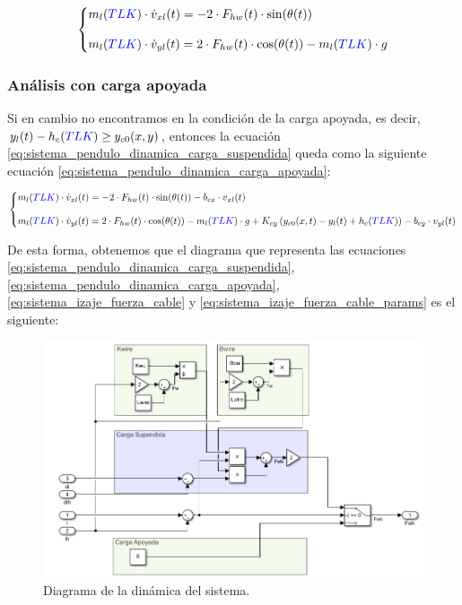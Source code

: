 \documentclass[11pt]{article}
\begin{document}
\begin{equation}
	\label{eq:sistema_pendulo_dinamica_carga_suspendida}
	\left\{
		\begin{matrix*}[l]
		m_{l}({\color{blue}TLK})\cdot \dot{v}_{xl}(t)= -2 \cdot F_{hw}(t)\cdot \sin(\theta(t))
		\\
		\\ 
		m_{l}({\color{blue}TLK})\cdot \dot{v}_{yl}(t)=2 \cdot F_{hw}(t)\cdot \cos(\theta(t))-m_{l}({\color{blue}TLK})\cdot g
		\end{matrix*}
	\right.
\end{equation}

\subsubsection{Análisis con carga apoyada}

Si en cambio no encontramos en la condición de la carga apoyada, es decir, $y_{l}(t)-h_{c}({\color{blue}TLK})\geq y_{c0}(x,y)$, entonces la ecuación \ref{eq:sistema_pendulo_dinamica_carga_suspendida} queda como la siguiente ecuación \ref{eq:sistema_pendulo_dinamica_carga_apoyada}:

\begin{equation}
	\label{eq:sistema_pendulo_dinamica_carga_apoyada}
	\left\{
		\begin{matrix*}[l]
		m_{l}({\color{blue}TLK})\cdot \dot{v}_{xl}(t)= -2 \cdot F_{hw}(t)\cdot \sin(\theta(t))-b_{cx}\cdot v_{xl}(t)
		\\
		\\ 
		m_{l}({\color{blue}TLK})\cdot \dot{v}_{yl}(t)=2 \cdot F_{hw}(t)\cdot \cos(\theta(t))-m_{l}({\color{blue}TLK})\cdot g + K_{cy} \left ( y_{c0}(x,t)-y_{l}(t)+h_{c}({\color{blue}TLK}) \right )-b_{cy}\cdot v_{yl}(t)
		\end{matrix*}
	\right.
\end{equation}

De esta forma, obtenemos que el diagrama que representa las ecuaciones \ref{eq:sistema_pendulo_dinamica_carga_suspendida}, \ref{eq:sistema_pendulo_dinamica_carga_apoyada}, \ref{eq:sistema_izaje_fuerza_cable} y \ref{eq:sistema_izaje_fuerza_cable_params} es el siguiente:

\begin{figure}[h!]
	\centering
	\includegraphics[width=1\textwidth]{images/imagen_9_sistema_pendulo_dinamica.png}
	\caption{Diagrama de la dinámica del sistema.}
	\label{fig:sistema_pendulo_dinamica}
\end{figure}
\end{document}

